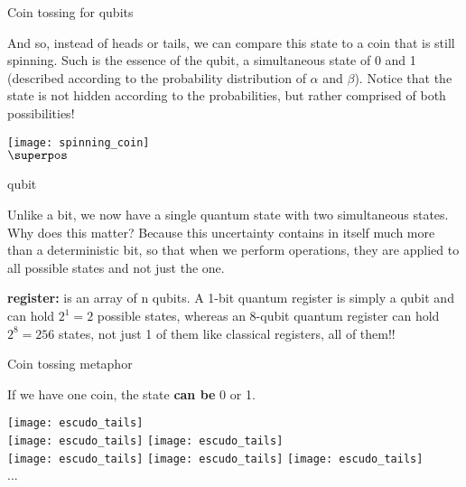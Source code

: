 \documentclass[aspectratio=43]{beamer}
\begin{document}
\begin{frame}{Coin tossing for qubits}
    \begin{card}
        And so, instead of heads or tails, we can compare this state to a coin that is still spinning. Such is the essence of the qubit, a simultaneous state of 0 and 1 (described according to the probability distribution of $\alpha$ and $\beta$).  Notice that the state is not hidden according to the probabilities, but rather comprised of both possibilities!  
    \end{card}
    \begin{center}
        \texttt{[image: spinning\_coin]}
        \\$\superpos$
    \end{center}
\pagenumber
\end{frame}

\begin{frame}{qubit}
    \begin{card}
        Unlike a bit, we now have a single quantum state with two simultaneous states. Why does this matter? Because this uncertainty contains in itself much more than a deterministic bit, so that when we perform operations, they are applied to all possible states and not just the one.
    \end{card}
	\begin{cardTiny}
		\textbf{\q register:} is an array of n qubits. A 1-bit quantum register is simply a qubit and can hold $2^1 = 2$ possible states, whereas an 8-qubit quantum register can hold $2^8 = 256$ states, not just 1 of them like classical registers, all of them!!
	\end{cardTiny}
\pagenumber
\end{frame}

\begin{frame}{Coin tossing metaphor}
	\begin{cardTiny}
		If we have one coin, the state \textbf{can be} 0 or 1.
	\end{cardTiny}
    \begin{center}
        \texttt{[image: escudo\_tails]}\\
        \texttt{[image: escudo\_tails]}
        \texttt{[image: escudo\_tails]}\\
        \texttt{[image: escudo\_tails]}
        \texttt{[image: escudo\_tails]}
        \texttt{[image: escudo\_tails]}\\...
	\end{center}
\pagenumber
\end{frame}
\end{document}
